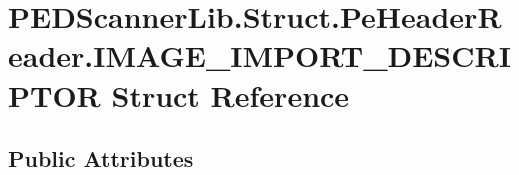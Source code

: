 \hypertarget{struct_p_e_d_scanner_lib_1_1_struct_1_1_pe_header_reader_1_1_i_m_a_g_e___i_m_p_o_r_t___d_e_s_c_r_i_p_t_o_r}{}\section{P\+E\+D\+Scanner\+Lib.\+Struct.\+Pe\+Header\+Reader.\+I\+M\+A\+G\+E\+\_\+\+I\+M\+P\+O\+R\+T\+\_\+\+D\+E\+S\+C\+R\+I\+P\+T\+OR Struct Reference}
\label{struct_p_e_d_scanner_lib_1_1_struct_1_1_pe_header_reader_1_1_i_m_a_g_e___i_m_p_o_r_t___d_e_s_c_r_i_p_t_o_r}
\subsection*{Public Attributes}
